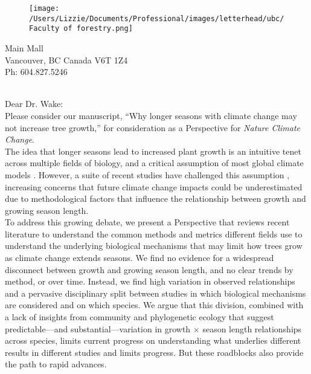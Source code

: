 \documentclass[11pt,a4paper]{article}
\begin{document}

\begin{figure}[htbp]
\hspace*{14cm}                                                           
\hspace{-35ex} \texttt{[image: /Users/Lizzie/Documents/Professional/images/letterhead/ubc/Faculty of forestry.png]}
\end{figure}
\vspace{-10ex}
\begin{small}
 Main Mall \\
\noindent Vancouver, BC Canada V6T 1Z4\\
\noindent Ph: 604.827.5246\\
\end{small}
\vspace{2ex}\\
\noindent Dear Dr. Wake: %
\vspace{1.5ex}\\
Please consider our manuscript, ``Why longer seasons with climate change may not increase tree growth,'' for consideration as a Perspective for \emph{Nature Climate Change}. 
\vspace{1.5ex}\\
The idea that longer seasons lead to increased plant growth is an intuitive tenet across multiple fields of biology, and a critical assumption of most global climate models \citep{friedlingstein2022global}. However, a suite of recent studies have challenged this assumption \citep[e.g.][]{dow2022warm,green2022limits}, increasing concerns that future climate change impacts could be underestimated due to methodological factors that influence the relationship between growth and growing season length\citep{green2022limits,korner2023four}.
\vspace{1.5ex}\\
To address this growing debate, we present a Perspective that reviews recent literature to understand the common methods and metrics different fields use to understand the underlying biological mechanisms that may limit how trees grow as climate change extends seasons. We find no evidence for a widespread disconnect between growth and growing season length, and no clear trends by method, or over time. Instead, we find high variation in observed relationships and a pervasive disciplinary split between studies in which biological mechanisms are considered and on which species. We argue that this division, combined with a lack of insights from community and phylogenetic ecology that suggest predictable---and substantial---variation in growth $\times$ season length relationships across species, limits current progress on understanding what underlies different results in different studies and limits progress. But these roadblocks also provide the path to rapid advances. 
\end{document}
